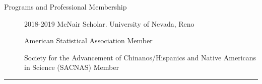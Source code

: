 \documentclass{article}
\begin{document}
\begin{description}
	\vspace{-2mm}
	\item[Programs and Professional Membership]\hspace*{.01in}
		
		2018-2019 McNair Scholar. University of Nevada, Reno
		\vspace*{1mm}
		
		American Statistical Association Member
		\vspace*{1mm}
		
		Society for the Advancement of Chinanos/Hispanics and Native Americans in Science (SACNAS) Member
		
\end{description}
\vspace{-2mm}
\rule{\linewidth}{1pt}


\end{document}
